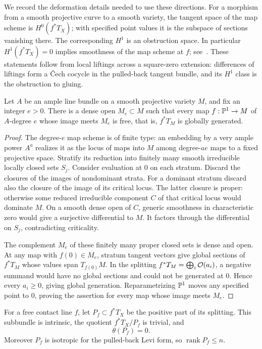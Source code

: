 We record the deformation details needed to use these directions.
For a morphism from a smooth projective curve to a smooth variety,
the tangent space of the map scheme is $H^0(f^*T_X)$; with specified
point values it is the subspace of sections vanishing there.
The corresponding $H^1$ is an obstruction space. In particular
$H^1(f^*T_X)=0$ implies smoothness of the map scheme at $f$;
see~\cite[Theorem~5]{AraujoKollar2003}. These statements follow
from local liftings across a square-zero extension: differences
of liftings form a \v{C}ech cocycle in the pulled-back tangent
bundle, and its $H^1$ class is the obstruction to gluing.

\begin{lemma}\label{lines:fixed-degree}
Let $A$ be an ample line bundle on a smooth projective variety $M$,
and fix an integer $e>0$. There is a dense open $M_e\subset M$
such that every map $f:\mathbb P^1\to M$ of $A$-degree $e$ whose image
meets $M_e$ is free, that is, $f^*T_M$ is globally generated.
\end{lemma}

\begin{proof}
The degree-$e$ map scheme is of finite type: an embedding by a
very ample power $A^a$ realizes it as the locus of maps into $M$
among degree-$ae$ maps to a fixed projective space. Stratify its
reduction into finitely many smooth irreducible locally closed
sets $S_j$. Consider evaluation at $0$ on each stratum.
Discard the closures of the images of nondominant strata.
For a dominant stratum discard also the closure of the image of
its critical locus. The latter closure is proper: otherwise
some reduced irreducible component $C$ of that critical locus
would dominate $M$. On a smooth dense open of $C$, generic
smoothness in characteristic zero would give a surjective
differential to $M$. It factors through the differential on
$S_j$, contradicting criticality.

The complement $M_e$ of these finitely many proper closed sets
is dense and open. At any map with $f(0)\in M_e$, stratum
tangent vectors give global sections of $f^*T_M$ whose values
span $T_{f(0)}M$. In the splitting
$f^*T_M=\bigoplus_i\mathcal O(a_i)$, a negative summand would have no
global sections and could not be generated at $0$. Hence every
$a_i\geq0$, giving global generation. Reparametrizing $\mathbb P^1$
moves any specified point to $0$, proving the assertion for
every map whose image meets $M_e$.
\end{proof}

\begin{lemma}\label{lines:positive}
For a free contact line $f$, let $P_f\subset f^*T_X$ be the
positive part of its splitting. This subbundle is intrinsic,
the quotient $f^*T_X/P_f$ is trivial, and
\begin{equation}\label{lines:positive-horizontal}
\theta(P_f)=0.
\end{equation}
Moreover $P_f$ is isotropic for the pulled-back Levi form, so
$\operatorname{rank}P_f\leq n$.
\end{lemma}

